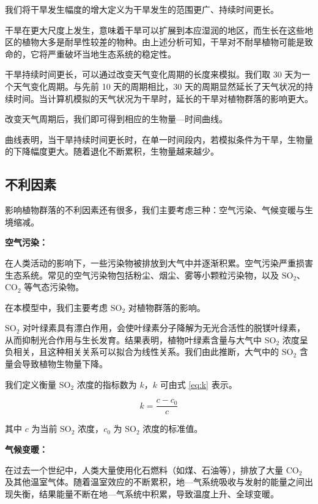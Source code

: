 \documentclass[11pt,a4paper]{ctexart}
\begin{document}
我们将干旱发生幅度的增大定义为干旱发生的范围更广、持续时间更长。

干旱在更大尺度上发生，意味着干旱可以扩展到本应湿润的地区，而生长在这些地区的植物大多是耐旱性较差的物种。由上述分析可知，干旱对不耐旱植物可能是致命的，它将严重破坏当地生态系统的稳定性。

干旱持续时间更长，可以通过改变天气变化周期的长度来模拟。我们取 30 天为一个天气变化周期。与先前 10 天的周期相比，30 天的周期显然延长了天气状况的持续时间。当计算机模拟的天气状况为干旱时，延长的干旱对植物群落的影响更大。

改变天气周期后，我们即可得到相应的生物量—时间曲线。

曲线表明，当干旱持续时间更长时，在单一时间段内，若模拟条件为干旱，生物量的下降幅度更大。随着退化不断累积，生物量越来越少。

\subsection{不利因素}

影响植物群落的不利因素还有很多，我们主要考虑三种：空气污染、气候变暖与生境缩减。

\textbf{空气污染：}

在人类活动的影响下，一些污染物被排放到大气中并逐渐积累。空气污染严重损害生态系统。常见的空气污染物包括粉尘、烟尘、雾等小颗粒污染物，以及 $\mathrm{SO_2}$、$\mathrm{CO_2}$ 等气态污染物。

在本模型中，我们主要考虑 $\mathrm{SO_2}$ 对植物群落的影响。

$\mathrm{SO_2}$ 对叶绿素具有漂白作用，会使叶绿素分子降解为无光合活性的脱镁叶绿素，从而抑制光合作用与生长发育。结果表明，植物叶绿素含量与大气中 $\mathrm{SO_2}$ 浓度呈负相关，且这种相关关系可以拟合为线性关系\cite{ref14}。我们由此推断，大气中的 $\mathrm{SO_2}$ 含量会导致植物生物量下降。

我们定义衡量 $\mathrm{SO_2}$ 浓度的指标数为 $k$，$k$ 可由式 \eqref{eq:k} 表示。

\begin{equation}
k=\frac{c-c_0}{c}
\label{eq:k}
\end{equation}

其中 $c$ 为当前 $\mathrm{SO_2}$ 浓度，$c_0$ 为 $\mathrm{SO_2}$ 浓度的标准值。

\textbf{气候变暖：}

在过去一个世纪中，人类大量使用化石燃料（如煤、石油等），排放了大量 $\mathrm{CO_2}$ 及其他温室气体。随着温室效应的不断累积，地—气系统吸收与发射的能量之间出现失衡，结果能量不断在地—气系统中积累，导致温度上升、全球变暖。
\end{document}
